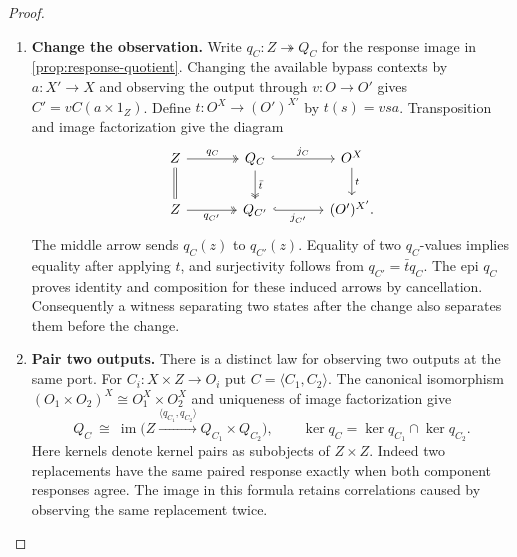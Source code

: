 \documentclass[11pt,a4paper]{article}
\theoremstyle{definition}
\theoremstyle{remark}\newaliascnt{remark}{theorem}
\numberwithin{equation}{section}
\begin{document}
\begin{proof}\leavevmode
\begin{enumerate}[titledsteps]
    \item \textbf{Change the observation.} Write \(q_C:Z\twoheadrightarrow Q_C\) for the response image in \cref{prop:response-quotient}. Changing the available bypass contexts by \(a:X'\to X\) and observing the output through \(v:O\to O'\) gives \(C'=vC(a\times1_Z)\). Define \(t:O^X\to (O')^{X'}\) by \(t(s)=vsa\). Transposition and image factorization give the diagram
\begin{equation}\label{eq:response-change}
\begin{tikzcd}[column sep=large]
 Z\arrow[r,two heads,"q_C"]\arrow[d,equal]&Q_C\arrow[r,hook,"j_C"]\arrow[d,two heads,"\bar t"]&
 O^X\arrow[d,"t"]\\
 Z\arrow[r,two heads,"q_{C'}"']&Q_{C'}\arrow[r,hook,"j_{C'}"']&(O')^{X'} .
\end{tikzcd}
\end{equation}
The middle arrow sends \(q_C(z)\) to \(q_{C'}(z)\). Equality of two \(q_C\)-values implies equality after applying \(t\), and surjectivity follows from \(q_{C'}=\bar t q_C\). The epi \(q_C\) proves identity and composition for these induced arrows by cancellation. Consequently a witness separating two states after the change also separates them before the change.


    \item \textbf{Pair two outputs.} There is a distinct law for observing two outputs at the same port. For \(C_i:X\times Z\to O_i\) put \(C=\langle C_1,C_2\rangle\). The canonical isomorphism \((O_1\times O_2)^X\cong O_1^X\times O_2^X\) and uniqueness of image factorization give
\[
 Q_C\ \cong\ \operatorname{im}\bigl(Z\xrightarrow{\langle q_{C_1},q_{C_2}\rangle}Q_{C_1}\times Q_{C_2}\bigr),
 \qquad \ker q_C=\ker q_{C_1}\cap\ker q_{C_2}.
\]
Here kernels denote kernel pairs as subobjects of \(Z\times Z\). Indeed two replacements have the same paired response exactly when both component responses agree. The image in this formula retains correlations caused by observing the same replacement twice.



\end{enumerate}
\end{proof}
\end{document}
